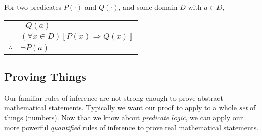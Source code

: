 \documentclass[main.tex]{subfiles}
\begin{document}
\begin{thm}
	For two predicates \(P(\cdot)\) and \(Q(\cdot)\), and some domain \(D\) with \(a \in D\),
	\begin{center}
		\begin{tabular}{c@{\,}l@{}}
			& \(\lnot Q(a)\) \\
			& \((\forall x \in D)[P(x) \Rightarrow Q(x)]\) \\
			\cline{2-2}
			\(\therefore\) & \(\lnot P(a)\)
		\end{tabular}
	\end{center}
\end{thm}

\subsection{Proving Things}

Our familiar rules of inference are not strong enough to prove abstract mathematical statements. Typically we want our proof to apply to a whole \textit{set} of things (numbers). Now that we know about \textit{predicate logic}, we can apply our more powerful \textit{quantified} rules of inference to prove real mathematical statements.
\end{document}
